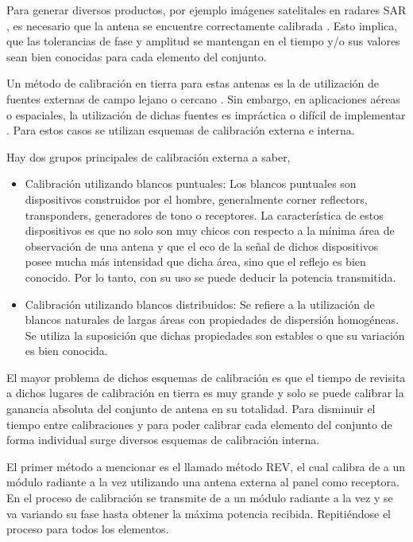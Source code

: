 Para generar diversos productos, por ejemplo imágenes satelitales en radares SAR \cite{Freeman1992}, es necesario que la
antena se encuentre correctamente calibrada \cite{Luscombe1990}\cite{Seifert1996}\cite{Dall1994}. Esto implica, que las
tolerancias de fase y amplitud se mantengan en el tiempo y/o sus valores sean bien conocidas para cada elemento del conjunto.

Un método de calibración en tierra para estas antenas es la de utilización de fuentes externas de campo lejano o cercano
\cite{Agrawal2003}. Sin embargo, en aplicaciones aéreas o espaciales, la utilización de dichas fuentes es impráctica o
difícil de implementar \cite{Aumann1989}. Para estos casos se utilizan esquemas de calibración externa e interna.

Hay dos grupos principales de calibración externa a saber,
\begin{itemize}
	\item Calibración utilizando blancos puntuales: Los blancos puntuales son dispositivos construidos por el hombre, generalmente
		corner reflectors, transponders, generadores de tono o receptores. La característica de estos dispositivos es que no
		solo son muy chicos con respecto a la mínima área de observación de una antena y que el eco de la señal de dichos
		dispositivos posee mucha más intensidad que dicha área, sino que el reflejo es bien conocido. Por lo tanto, con su uso
		se puede deducir la potencia transmitida.
	\item Calibración utilizando blancos distribuidos: Se refiere a la utilización de blancos naturales de largas áreas con
		propiedades de dispersión homogéneas. Se utiliza la suposición que dichas propiedades son estables o que su variación es
		bien conocida.
\end{itemize}

El mayor problema de dichos esquemas de calibración es que el tiempo de revisita a dichos lugares de calibración en tierra es muy
grande y solo se puede calibrar la ganancia absoluta del conjunto de antena en su totalidad. Para disminuir el tiempo entre
calibraciones y para poder calibrar cada elemento del conjunto de forma individual surge diversos esquemas de calibración
interna.

El primer método a mencionar es el llamado método REV, el cual calibra de a un módulo radiante a la vez utilizando una
antena externa al panel como receptora. En el proceso de calibración se transmite de a un módulo radiante a la vez
y se va variando su fase hasta obtener la máxima potencia recibida. Repitiéndose el proceso para todos los elementos.

